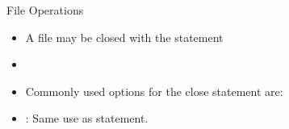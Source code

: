 \documentclass[10pt,t]{beamer}
\begin{document}
\begin{frame}{File Operations}
\begin{itemize}
      \framebreak
    \item A file may be closed with the statement
    \item[]
    \item Commonly used options for the close statement are:
    \item[] : Same use as  statement.

\end{itemize}
\end{frame}
\end{document}
